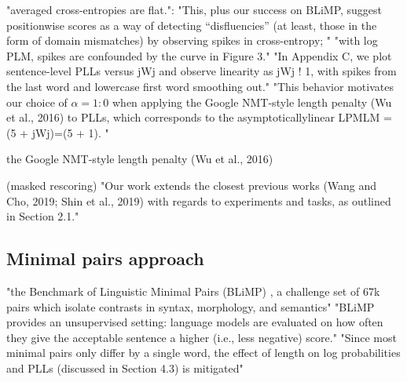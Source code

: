 "averaged cross-entropies are flat.": "This, plus our success on BLiMP, suggest positionwise scores as a way of detecting “disfluencies” (at least, those in the form of domain mismatches) by observing spikes in cross-entropy; "  \citet{salazar2020masked}
"with log PLM, spikes are confounded by the curve in Figure 3."  \citet{salazar2020masked}
"In Appendix C, we plot sentence-level PLLs versus jWj and observe linearity as jWj ! 1, with spikes from the last word and lowercase first word smoothing out." "This behavior motivates our choice of $\alpha = 1:0$ when applying the Google NMT-style length penalty (Wu et al., 2016)  to PLLs, which corresponds to the asymptoticallylinear LPMLM = (5 + jWj)=(5 + 1). " \citet{salazar2020masked}

the Google NMT-style length penalty (Wu et al., 2016)   \citet{salazar2020masked}

(masked rescoring)
"Our work extends the closest previous works (Wang and Cho, 2019; Shin et al., 2019) with regards to experiments and tasks, as outlined in Section 2.1." \citet{salazar2020masked}

\subsection{Minimal pairs approach}


"the Benchmark of Linguistic Minimal Pairs (BLiMP) \citep{warstadt2020blimp}, a
challenge set of 67k pairs which isolate contrasts in syntax, morphology, and semantics"  \citep{salazar2020masked} 
"BLiMP provides an unsupervised setting: language models are evaluated on how often they give the acceptable sentence a higher (i.e., less
negative) score." \citep{salazar2020masked} 
"Since most minimal pairs only differ by a single
word, the effect of length on log probabilities and
PLLs (discussed in Section 4.3) is mitigated"  \citep{salazar2020masked} 



